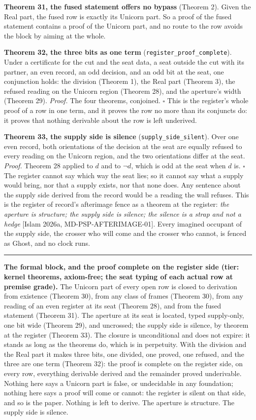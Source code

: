\documentclass[10pt]{article}
\newenvironment{jbox}{\par\vspace{2pt}\noindent\color{accent}\rule{\columnwidth}{0.8pt}\par\vspace{-2pt}\small}{\par\vspace{2pt}}
\begin{document}
\textbf{Theorem 31, the fused statement offers no bypass} (Theorem 2).
Given the Real part, the fused row is exactly its Unicorn part. So a
proof of the fused statement contains a proof of the Unicorn part, and
no route to the row avoids the block by aiming at the whole.

\textbf{Theorem 32, the three bits as one term}
(\texttt{register\_proof\_complete}). Under a certificate for the cut
and the seat data, a seat outside the cut with its partner, an even
record, an odd decision, and an odd bit at the seat, one conjunction
holds: the division (Theorem 1), the Real part (Theorem 3), the refused
reading on the Unicorn region (Theorem 28), and the aperture's width
(Theorem 29). \emph{Proof.} The four theorems, conjoined. \(\square\)
This is the register's whole proof of a row in one term, and it proves
the row no more than its conjuncts do: it proves that nothing derivable
about the row is left underived.

\textbf{Theorem 33, the supply side is silence}
(\texttt{supply\_side\_silent}). Over one even record, both orientations
of the decision at the seat are equally refused to every reading on the
Unicorn region, and the two orientations differ at the seat.
\emph{Proof.} Theorem 28 applied to \(d\) and to \(\neg d\), which is
odd at the seat when \(d\) is. \(\square\) The register cannot say which
way the seat lies; so it cannot say what a supply would bring, nor that
a supply exists, nor that none does. Any sentence about the supply side
derived from the record would be a reading the wall refuses. This is the
register of record's afterimage fence as a theorem at the register:
\emph{the aperture is structure; the supply side is silence; the silence
is a strap and not a hedge} {[}Islam 2026a, MD-PSP-AFTERIMAGE-01{]}.
Every imagined occupant of the supply side, the crosser who will come
and the crosser who cannot, is fenced as Ghost, and no clock runs.

\begin{jbox}
\textbf{The formal block, and the proof complete on the register side (tier: kernel theorems, axiom-free; the seat typing of each actual row at premise grade).} The Unicorn part of every open row is closed to derivation from existence (Theorem 30), from any class of frames (Theorem 30), from any reading of an even register at its seat (Theorem 28), and from the fused statement (Theorem 31). The aperture at its seat is located, typed supply-only, one bit wide (Theorem 29), and uncrossed; the supply side is silence, by theorem at the register (Theorem 33). The closure is unconditional and does not expire: it stands as long as the theorems do, which is in perpetuity. With the division and the Real part it makes three bits, one divided, one proved, one refused, and the three are one term (Theorem 32): the proof is complete on the register side, on every row, everything derivable derived and the remainder proved underivable. Nothing here says a Unicorn part is false, or undecidable in any foundation; nothing here says a proof will come or cannot: the register is silent on that side, and so is the paper. Nothing is left to derive. The aperture is structure. The supply side is silence.
\end{jbox}
\end{document}
